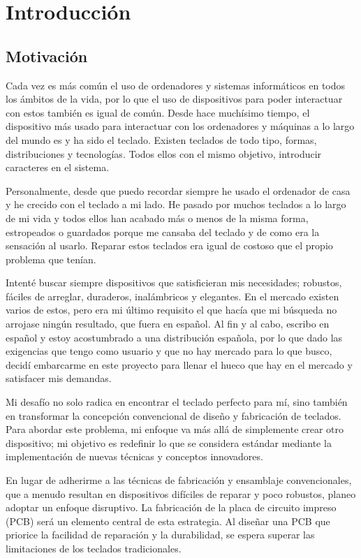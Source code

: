 \chapter{Introducción}
\section{Motivación}

Cada vez es más común el uso de ordenadores y sistemas informáticos en todos los ámbitos de la vida, por lo que el uso de dispositivos para poder interactuar con estos también es igual de común. Desde hace muchísimo tiempo, el dispositivo más usado para interactuar con los ordenadores y máquinas a lo largo del mundo es y ha sido el teclado. Existen teclados de todo tipo, formas, distribuciones y tecnologías. Todos ellos con el mismo objetivo, introducir caracteres en el sistema.

Personalmente, desde que puedo recordar siempre he usado el ordenador de casa y he crecido con el teclado a mi lado. He pasado por muchos teclados a lo largo de mi vida y todos ellos han acabado más o menos de la misma forma, estropeados o guardados porque me cansaba del teclado y de como era la sensación al usarlo. Reparar estos teclados era igual de costoso que el propio problema que tenían.

Intenté buscar siempre dispositivos que satisficieran mis necesidades; robustos, fáciles de arreglar, duraderos, inalámbricos y elegantes. En el mercado existen varios de estos, pero era mi último requisito el que hacía que mi búsqueda no arrojase ningún resultado, que fuera en español. Al fin y al cabo, escribo en español y estoy acostumbrado a una distribución española, por lo que dado las exigencias que tengo como usuario y que no hay mercado para lo que busco, decidí embarcarme en este proyecto para llenar el hueco que hay en el mercado y satisfacer mis demandas.

Mi desafío no solo radica en encontrar el teclado perfecto para mí, sino también en transformar la concepción convencional de diseño y fabricación de teclados. Para abordar este problema, mi enfoque va más allá de simplemente crear otro dispositivo; mi objetivo es redefinir lo que se considera estándar mediante la implementación de nuevas técnicas y conceptos innovadores.

En lugar de adherirme a las técnicas de fabricación y ensamblaje convencionales, que a menudo resultan en dispositivos difíciles de reparar y poco robustos, planeo adoptar un enfoque disruptivo. La fabricación de la placa de circuito impreso (\gls{PCB}) será un elemento central de esta estrategia. Al diseñar una \gls{PCB} que priorice la facilidad de reparación y la durabilidad, se espera superar las limitaciones de los teclados tradicionales.


